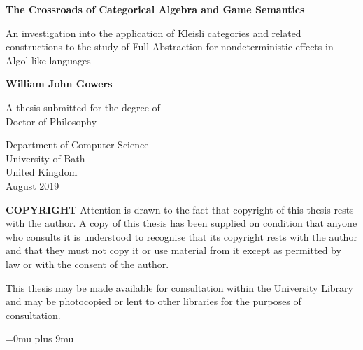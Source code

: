 \documentclass[11pt]{report}
\begin{document}
\begin{titlepage}
  \begin{center}
    \Huge
    \textbf{The Crossroads of Categorical Algebra and Game Semantics}
 
    \vspace{0.2cm}
    \LARGE
    An investigation into the application of Kleisli categories and related constructions to the study of Full Abstraction for nondeterministic effects in Algol-like languages
 
    \vspace{0.3cm}
 
    \textbf{William John Gowers}
 
    A thesis submitted for the degree of\\
    Doctor of Philosophy
 
    \vspace{0.1cm}
 
    \Large
    Department of Computer Science\\
    University of Bath\\
    United Kingdom\\
    August 2019

    \textbf{COPYRIGHT}
    Attention is drawn to the fact that copyright of this thesis rests with the author. A copy of this thesis has
    been supplied on condition that anyone who consults it is understood to recognise that its copyright rests
    with the author and that they must not copy it or use material from it except as permitted by law or with
    the consent of the author. 
    
    This thesis may be made available for consultation within
    the University Library and may be photocopied or lent to other libraries
    for the purposes of consultation. \ul{\hspace{64pt}}
 
  \end{center}
\end{titlepage}

\let\OldClearpage\clearpage
\let\clearpage\relax

\tableofcontents
\listoffigures

\let\clearpage\OldClearpage
\newpage









\Urlmuskip=0mu plus 9mu\relax


\end{document}
